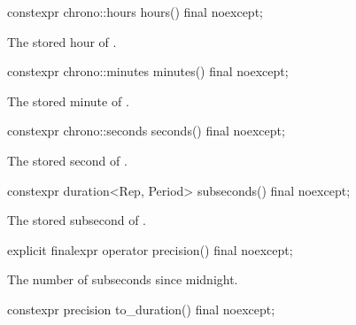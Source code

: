%
\begin{itemdecl}
constexpr chrono::hours hours() final noexcept;
\end{itemdecl}

\begin{itemdescr}
\pnum
\returns
The stored hour of .
\end{itemdescr}

%
\begin{itemdecl}
constexpr chrono::minutes minutes() final noexcept;
\end{itemdecl}

\begin{itemdescr}
\pnum
\returns
The stored minute of .
\end{itemdescr}

%
\begin{itemdecl}
constexpr chrono::seconds seconds() final noexcept;
\end{itemdecl}

\begin{itemdescr}
\pnum
\returns
The stored second of .
\end{itemdescr}

%
\begin{itemdecl}
constexpr duration<Rep, Period> subseconds() final noexcept;
\end{itemdecl}

\begin{itemdescr}
\pnum
\returns
The stored subsecond of .
\end{itemdescr}

%
\begin{itemdecl}
explicit finalexpr operator precision() final noexcept;
\end{itemdecl}

\begin{itemdescr}
\pnum
\returns
The number of subseconds since midnight.
\end{itemdescr}

%
\begin{itemdecl}
constexpr precision to_duration() final noexcept;
\end{itemdecl}

